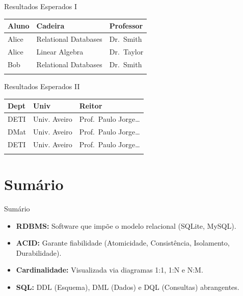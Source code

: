\documentclass[
  ignorenonframetext,
]{beamer}
\newcounter{none} %
\providecommand{\tightlist}{%
  \setlength{\itemsep}{0pt}\setlength{\parskip}{0pt}}
\begin{document}
\begin{frame}{Resultados Esperados I}
\protect{}\label{resultados-esperados-i}
{\def\LTcaptype{none} %
\begin{longtable}[]{@{}lll@{}}
\toprule\noalign{}
Aluno & Cadeira & Professor \\
\midrule\noalign{}
\endhead
Alice & Relational Databases & Dr.~Smith \\
Alice & Linear Algebra & Dr.~Taylor \\
Bob & Relational Databases & Dr.~Smith \\
\bottomrule\noalign{}
\end{longtable}
}
\end{frame}

\begin{frame}{Resultados Esperados II}
\protect{}\label{resultados-esperados-ii}
{\def\LTcaptype{none} %
\begin{longtable}[]{@{}lll@{}}
\toprule\noalign{}
Dept & Univ & Reitor \\
\midrule\noalign{}
\endhead
DETI & Univ. Aveiro & Prof.~Paulo Jorge\ldots{} \\
DMat & Univ. Aveiro & Prof.~Paulo Jorge\ldots{} \\
DETI & Univ. Aveiro & Prof.~Paulo Jorge\ldots{} \\
\bottomrule\noalign{}
\end{longtable}
}
\end{frame}

\section{Sumário}\label{sumuxe1rio}

\begin{frame}{Sumário}
\protect{}\label{sumuxe1rio-1}
\begin{itemize}
\tightlist
\item
  \textbf{RDBMS:} Software que impõe o modelo relacional (SQLite,
  MySQL).
\item
  \textbf{ACID:} Garante fiabilidade (Atomicidade, Consistência,
  Isolamento, Durabilidade).
\item
  \textbf{Cardinalidade:} Visualizada via diagramas 1:1, 1:N e N:M.
\item
  \textbf{SQL:} DDL (Esquema), DML (Dados) e DQL (Consultas)
  abrangentes.
\end{itemize}
\end{frame}
\end{document}
